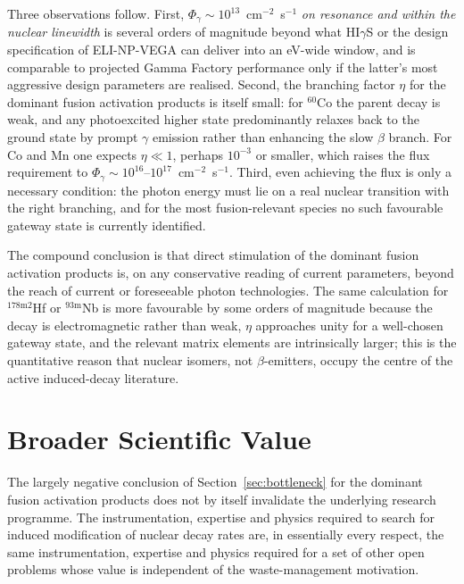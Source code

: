 \documentclass[conference]{IEEEtran}
\begin{document}
Three observations follow. First, $\Phi_\gamma \sim 10^{13}$~cm$^{-2}$~s$^{-1}$ \emph{on resonance and within the nuclear linewidth} is several orders of magnitude beyond what HI$\gamma$S or the design specification of ELI-NP-VEGA can deliver into an eV-wide window, and is comparable to projected Gamma Factory performance only if the latter's most aggressive design parameters are realised. Second, the branching factor $\eta$ for the dominant fusion activation products is itself small: for $^{60}$Co the parent decay is weak, and any photoexcited higher state predominantly relaxes back to the ground state by prompt $\gamma$ emission rather than enhancing the slow $\beta$ branch. For Co and Mn one expects $\eta \ll 1$, perhaps $10^{-3}$ or smaller, which raises the flux requirement to $\Phi_\gamma \sim 10^{16}\text{--}10^{17}$~cm$^{-2}$~s$^{-1}$. Third, even achieving the flux is only a necessary condition: the photon energy must lie on a real nuclear transition with the right branching, and for the most fusion-relevant species no such favourable gateway state is currently identified.

The compound conclusion is that direct stimulation of the dominant fusion activation products is, on any conservative reading of current parameters, beyond the reach of current or foreseeable photon technologies. The same calculation for $^{178\mathrm{m}2}$Hf or $^{93\mathrm{m}}$Nb is more favourable by some orders of magnitude because the decay is electromagnetic rather than weak, $\eta$ approaches unity for a well-chosen gateway state, and the relevant matrix elements are intrinsically larger; this is the quantitative reason that nuclear isomers, not $\beta$-emitters, occupy the centre of the active induced-decay literature.

\section{Broader Scientific Value}
\label{sec:value}
The largely negative conclusion of Section~\ref{sec:bottleneck} for the dominant fusion activation products does not by itself invalidate the underlying research programme. The instrumentation, expertise and physics required to search for induced modification of nuclear decay rates are, in essentially every respect, the same instrumentation, expertise and physics required for a set of other open problems whose value is independent of the waste-management motivation.
\end{document}
